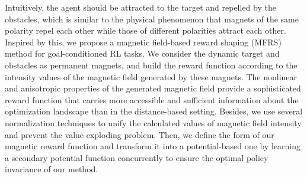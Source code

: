 \documentclass[journal]{IEEEtran}
\begin{document}
Intuitively, the agent should be attracted to the target and repelled by the obstacles, which is similar to the physical phenomenon that magnets of the same polarity repel each other while those of different polarities attract each other.
Inspired by this, we propose a magnetic field-based reward shaping (MFRS) method for goal-conditioned RL tasks. We consider the dynamic target and obstacles as permanent magnets, and build the reward function according to the intensity values of the magnetic field generated by these magnets.
The nonlinear and anisotropic properties of the generated magnetic field provide a sophisticated reward function that carries more accessible and sufficient information about the optimization landscape than in the distance-based setting.
Besides, we use several normalization techniques to unify the calculated values of magnetic field intensity and prevent the value exploding problem.
Then, we define the form of our magnetic reward function and transform it into a potential-based one by learning a secondary potential function concurrently to ensure the optimal policy invariance of our method.
\end{document}
